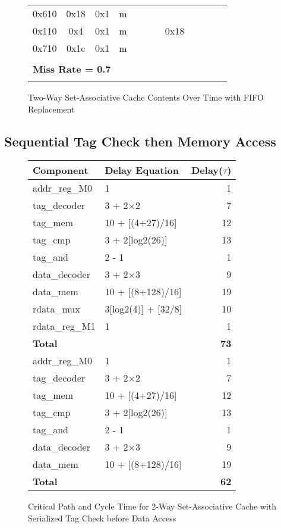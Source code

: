 \documentclass[10pt]{article}
\begin{document}
\begin{figure}[H]
{\begin{tabular}{@{\extracolsep{3pt}}cccccccccccc@{}}
0x610 & 0x18& 0x1 & m &     &     &     &     &     &     &     &     \\
0x110 & 0x4 & 0x1 & m &     &     &     & 0x18&     &     &     &     \\
0x710 & 0x1c& 0x1 & m &     &     &     &     &     &     &     &     \\
\Xhline{2\arrayrulewidth}
\multicolumn{12}{l}{\textbf{Number of Misses = 14}} \\
\hline
\multicolumn{12}{l}{\textbf{Miss Rate = 0.7}} \\
\Xhline{2\arrayrulewidth}
\end{tabular}
}
\caption{Two-Way Set-Associative Cache Contents Over Time with FIFO Replacement}
\end{figure}

\subsection{Sequential Tag Check then Memory Access}
\begin{figure}[H]
\centering
\begin{tabular}{@{\extracolsep{3pt}}llr@{}}
\hline
\textbf{Component} & \textbf{Delay Equation} & \textbf{Delay($\tau$)} \\
\hline
addr\_reg\_M0 & 1 & 1 \\
tag\_decoder & 3 + 2$\times$2 & 7 \\
tag\_mem 	& 10 + [(4+27)/16] & 12 \\
tag\_cmp		& 3 + 2[log2(26)] & 13 \\
tag\_and		& 2 - 1 & 1\\
data\_decoder& 3 + 2$\times$3 & 9 \\
data\_mem	& 10 + [(8+128)/16] & 19 \\
rdata\_mux	& 3[log2(4)] + [32/8] & 10 \\
rdata\_reg\_M1& 1 & 1 \\
\hline
\textbf{Total} & & \textbf{73} \\
\hline
addr\_reg\_M0 & 1 & 1 \\
tag\_decoder & 3 + 2$\times$2 & 7 \\
tag\_mem 	& 10 + [(4+27)/16] & 12 \\
tag\_cmp		& 3 + 2[log2(26)] & 13 \\
tag\_and		& 2 - 1 & 1\\
data\_decoder& 3 + 2$\times$3 & 9 \\
data\_mem	& 10 + [(8+128)/16] & 19 \\
\hline
\textbf{Total} & & \textbf{62} \\
\hline
\end{tabular}
\captionsetup{justification=centering}
\caption{Critical Path and Cycle Time for 2-Way Set-Associative Cache with 
\\ Serialized Tag Check before Data Access}
\end{figure}
\end{document}
